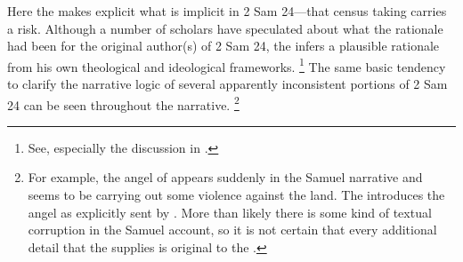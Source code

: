 \noindent
Here the \chronicler makes explicit what is implicit in 2 Sam 24---that census taking carries a risk. Although a number of scholars have speculated about what the rationale had been for the original author(s) of 2 Sam 24, the \chronicler infers a plausible rationale from his own theological and ideological frameworks.%
    \footnote{See, especially the discussion in \cite[512--514]{mccarter1984}.}
The same basic tendency to clarify the narrative logic of several apparently inconsistent portions of 2 Sam 24 can be seen throughout the narrative.%
    \footnote{For example, the angel of \yahweh appears suddenly in the Samuel narrative and seems to be carrying out some violence against the land. The \chronicler introduces the angel as explicitly sent by \yahweh. More than likely there is some kind of textual corruption in the Samuel account, so it is not certain that every additional detail that the \chronicler supplies is original to the \chronicler.}

